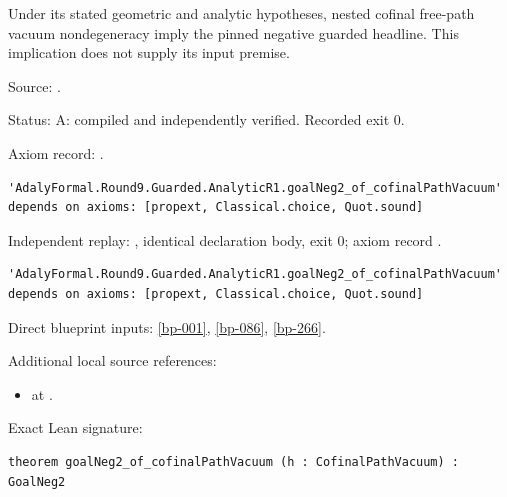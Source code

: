 \begin{theorem}[bp-267]
\label{bp-267}
\leanok
Under its stated geometric and analytic hypotheses, nested cofinal free-path vacuum nondegeneracy imply the pinned negative guarded headline. This implication does not supply its input premise.

\par Source: \texttt{}.
\par Status: A: compiled and independently verified. Recorded exit 0.
\par Axiom record: \texttt{}.
\begin{verbatim}
'AdalyFormal.Round9.Guarded.AnalyticR1.goalNeg2_of_cofinalPathVacuum' depends on axioms: [propext, Classical.choice, Quot.sound]
\end{verbatim}
\par Independent replay: \texttt{}, identical declaration body, exit 0; axiom record \texttt{}.
\begin{verbatim}
'AdalyFormal.Round9.Guarded.AnalyticR1.goalNeg2_of_cofinalPathVacuum' depends on axioms: [propext, Classical.choice, Quot.sound]
\end{verbatim}
\par Direct blueprint inputs: \ref{bp-001}, \ref{bp-086}, \ref{bp-266}.
\par Additional local source references:
\begin{itemize}
\item \texttt{} at \texttt{}.
\end{itemize}
\par Exact Lean signature:
\begin{verbatim}
theorem goalNeg2_of_cofinalPathVacuum (h : CofinalPathVacuum) : GoalNeg2
\end{verbatim}
\end{theorem}

